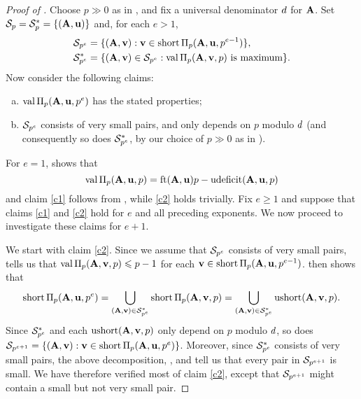 \documentclass{amsart}
\begin{document}
\begin{proof}[Proof of ]
   Choose $p \gg 0$ as in , and fix a universal denominator $\denom$ for $\matA$.
   Set $\S_p = \S^*_p = \{ (\matA,\vv{u}) \}$ and, for each $e > 1$,
   \begin{align*}
   \S_{p^{e}} &= \{ (\matA,\vv{v}):  \vv{v} \in \short \IP_p(\matA,\vv{u},p^{e-1}) \},\\
   \S^*_{p^{e}} &= \{ (\matA,\vv{v}) \in \S_{p^{e}}:  \val\IP_p(\matA,\vv{v},p)\text{ is maximum} \}.
   \end{align*}
   Now consider the following claims:
   \begin{enumerate}[(a),leftmargin=*]
      \item\label{c1} $\val \IP_p(\matA,\vv{u},p^e)$ has the stated properties;
      \item\label{c2} $\S_{p^e}$ consists of very small pairs, and only depends on $p$ modulo $\denom$ (and consequently so does $\S^*_{p^e}$, by our choice of $p\gg 0$ as in ).
   \end{enumerate}
   For $e=1$,  shows that
   \[ \val \IP_p(\matA,\vv{u},p) = \ft{\matA}{\vv{u}}p-\udeficit(\matA,\vv{u},p)\]
   and claim \ref{c1} follows from , while \ref{c2} holds trivially.
   Fix $e\ge 1$ and suppose that claims \ref{c1} and \ref{c2} hold for $e$ and all preceding exponents.
   We now proceed to investigate these claims for $e+1$.

   We start with claim \ref{c2}.
   Since we assume that $\S_{p^e}$ consists of very small pairs,  tells us that $\val\IP_p(\matA,\vv{v},p) \le p-1$ for each $\vv{v} \in \short \IP_p(\matA,\vv{u},p^{e-1})$.
    then shows that
   \[\short \IP_p(\matA,\vv{u},p^{e}) = \bigcup_{(\matA,\vv{v}) \in \S^*_{p^e}} \short \IP_p(\matA,\vv{v}, p)
      = \bigcup_{(\matA,\vv{v}) \in \S^*_{p^e}} \ushort(\matA,\vv{v}, p).\]
   Since $\S^*_{p^e}$ and each $\ushort(\matA,\vv{v}, p)$ only depend on $p$ modulo $\denom$, so does $\S_{p^{e+1}} = \{(\matA,\vv{v}): \vv{v}\in \short \IP_p(\matA,\vv{u},p^{e})\}$.
   Moreover, since $\S^*_{p^e}$ consists of very small pairs, the above decomposition, , and  tell us that every pair in $\S_{p^{e+1}}$ is small.
   We have therefore verified most of claim \ref{c2}, except that $\S_{p^{e+1}}$ might contain a small but not very small pair.


\end{proof}
\end{document}
